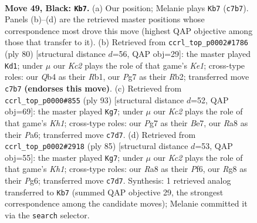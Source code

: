\documentclass[11pt]{article}
\begin{document}
\clearpage

\begin{figure}[p]\centering
\begin{subfigure}{0.46\textwidth}\centering
\resizebox{\linewidth}{!}{%
\newchessgame
\chessboard[
  setfen={r5r1/p1k3p1/7p/3p3P/pq1P2Pb/4P3/2Q3K1/5N2 b - - 7 49},
  showmover=false,
  pgfstyle=straightmove, color=movearrow, markmove={c7-b7}
]}
\caption{}
\end{subfigure}\hfill
\begin{subfigure}{0.46\textwidth}\centering
\resizebox{\linewidth}{!}{%
\newchessgame
\chessboard[
  setfen={7k/6p1/1P1p3p/8/p2P4/P3q3/1R5P/1R2K3 w - - 0 41},
  showmover=false,
  pgfstyle=straightmove, color=movearrow, markmove={e1-d1}
]}
\caption{}
\end{subfigure}
\\[4pt]
\begin{subfigure}{0.46\textwidth}\centering
\resizebox{\linewidth}{!}{%
\newchessgame
\chessboard[
  setfen={2Q4k/4bp2/p4r1p/1p6/8/1P5P/P5P1/6K1 b - - 17 47},
  showmover=false,
  pgfstyle=straightmove, color=movearrow, markmove={h8-g7}
]}
\caption{}
\end{subfigure}\hfill
\begin{subfigure}{0.46\textwidth}\centering
\resizebox{\linewidth}{!}{%
\newchessgame
\chessboard[
  setfen={3Q3k/8/p4pp1/P7/1pP4p/1P5P/6PK/4rr2 b - - 0 43},
  showmover=false,
  pgfstyle=straightmove, color=movearrow, markmove={h8-g7}
]}
\caption{}
\end{subfigure}
\caption{\textbf{Move 49, Black: \texttt{Kb7}.} (a) Our position; Melanie plays \texttt{Kb7} (\texttt{c7b7}). Panels (b)--(d) are the retrieved master positions whose correspondence most drove this move (highest QAP objective among those that transfer to it). (b) Retrieved from \texttt{ccrl\_top\_p0002\#1786} (ply 80) [structural distance $d$=56, QAP obj=29]: the master played \texttt{Kd1}; under $\mu$ our \emph{Kc2} plays the role of that game's \emph{Ke1}; cross-type roles: our \emph{Q}b4 as their \emph{R}b1, our \emph{P}g7 as their \emph{R}b2; transferred move \texttt{c7b7} \textbf{(endorses this move)}. (c) Retrieved from \texttt{ccrl\_top\_p0000\#855} (ply 93) [structural distance $d$=52, QAP obj=69]: the master played \texttt{Kg7}; under $\mu$ our \emph{Kc2} plays the role of that game's \emph{Kh1}; cross-type roles: our \emph{P}g7 as their \emph{B}e7, our \emph{R}a8 as their \emph{P}a6; transferred move \texttt{c7d7}. (d) Retrieved from \texttt{ccrl\_top\_p0002\#2918} (ply 85) [structural distance $d$=53, QAP obj=55]: the master played \texttt{Kg7}; under $\mu$ our \emph{Kc2} plays the role of that game's \emph{Kh1}; cross-type roles: our \emph{R}a8 as their \emph{P}f6, our \emph{R}g8 as their \emph{P}g6; transferred move \texttt{c7d7}. Synthesis: 1 retrieved analog transferred to \texttt{Kb7} (summed QAP objective 29, the strongest correspondence among the candidate moves); Melanie committed it via the \texttt{search} selector.}
\label{fig:thought-m97}
\end{figure}
\end{document}
